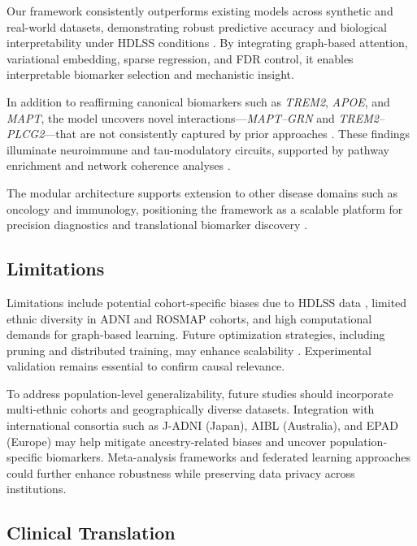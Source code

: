 \documentclass[12pt]{article}
\begin{document}
Our framework consistently outperforms existing models across synthetic and real-world datasets, demonstrating robust predictive accuracy and biological interpretability under HDLSS conditions \citep{fan2008sure, lecun2015deep}. By integrating graph-based attention, variational embedding, sparse regression, and FDR control, it enables interpretable biomarker selection and mechanistic insight.

In addition to reaffirming canonical biomarkers such as \textit{TREM2}, \textit{APOE}, and \textit{MAPT}, the model uncovers novel interactions—\textit{MAPT–GRN} and \textit{TREM2–PLCG2}—that are not consistently captured by prior approaches \citep{singh2019diablo, chen2021mocat, tan2025amogel, rashid2024momlin}. These findings illuminate neuroimmune and tau-modulatory circuits, supported by pathway enrichment and network coherence analyses \citep{raj2012network, de2019integrative}.

The modular architecture supports extension to other disease domains such as oncology and immunology, positioning the framework as a scalable platform for precision diagnostics and translational biomarker discovery \citep{cardillo2025advancements}.
\subsection*{Limitations}

Limitations include potential cohort-specific biases due to HDLSS data \citep{lee2021bias, johnson2007adjusting}, limited ethnic diversity in ADNI and ROSMAP cohorts, and high computational demands for graph-based learning. Future optimization strategies, including pruning and distributed training, may enhance scalability \citep{xu2023scalable}. Experimental validation remains essential to confirm causal relevance.

To address population-level generalizability, future studies should incorporate multi-ethnic cohorts and geographically diverse datasets. Integration with international consortia such as J-ADNI (Japan), AIBL (Australia), and EPAD (Europe) may help mitigate ancestry-related biases and uncover population-specific biomarkers. Meta-analysis frameworks and federated learning approaches could further enhance robustness while preserving data privacy across institutions.
\subsection*{Clinical Translation}
\end{document}

